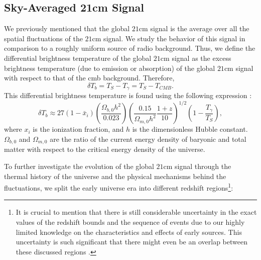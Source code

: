 \documentclass[12pt, TexShade, letterpaper]{report}
\begin{document}
\subsection{Sky-Averaged 21cm Signal}
\label{chap:global21cm,sub:physics,sub:global}
We previously mentioned that the global $\mathrm{21cm}$ signal is the average over all the spatial fluctuations of the $\mathrm{21cm}$ signal. We study the behavior of this signal in comparison to a roughly uniform source of radio background. Thus, we define the differential brightness temperature of the global $\mathrm{21cm}$ signal as the excess brightness temperature (due to emission or absorption) of the global $\mathrm{21cm}$ signal with respect to that of the \gls{cmb} background. Therefore,
\begin{equation}
    \delta T_b = T_{S} - T_{\gamma} = T_S - T_{CMB}.
\end{equation}
This differential brightness temperature is found using the following expression \cite{low_frequency}:
\begin{equation}
    \delta T_b \approx 27 \left(1- \bar{x}_i\right) \left(\frac{\Omega_{b, 0}h^2}{0.023}\right) \left( \frac{0.15}{\Omega_{m, 0}h^2} \frac{1+z}{10}\right)^{1/2}\left(1-\frac{T_\gamma}{T_S}\right),
    \label{eq:global_curve}
\end{equation}
where $x_i$ is the ionization fraction, and $h$ is the dimensionless Hubble constant. $\Omega_{b, 0}$ and $\Omega_{m, 0}$ are the ratio of the current energy density of baryonic and total matter with respect to the critical energy density of the universe.\par
To further investigate the evolution of the global $\mathrm{21cm}$ signal through the thermal history of the universe and the physical mechanisms behind the fluctuations, we split the early universe era into different redshift regions\footnote{It is crucial to mention that there is still considerable uncertainty in the exact values of the redshift bounds and the sequence of events due to our highly limited knowledge on the characteristics and effects of early sources. This uncertainty is such significant that there might even be an overlap between these discussed regions \cite{21century}.}:\par
\end{document}
